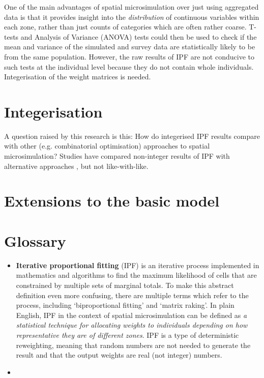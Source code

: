 \documentclass[a4paper, 11pt, twoside]{article}
\begin{document}
One of the main advantages %
of spatial microsimulation over just using aggregated data is that it provides
insight into the \emph{distribution} of continuous variables within each zone,
rather than just counts of categories which are often rather coarse. T-tests and
Analysis of Variance (ANOVA) tests could then be used to check if the
mean and variance of the simulated and survey data are statistically likely
to be from the same population. However, the raw results of IPF are not
conducive to such tests at the individual level because they do not contain
whole individuals. Integerisation of the weight matrices is needed.


\section{Integerisation} 
A question raised by this research is this: How do integerised IPF results
compare with other (e.g. combinatorial optimisation) approaches to spatial
microsimulation?
Studies have compared non-integer results of IPF with
alternative approaches \citep{harland2012}, but not like-with-like.

\section{Extensions to the basic model}
\label{discuss}

\section{Glossary}
\begin{itemize}
 \item \textbf{Iterative proportional fitting} (IPF) is an iterative process implemented in
mathematics and algorithms to find the maximum likelihood of cells that are constrained by
multiple sets of marginal totals. To make this abstract definition even more confusing, there are
multiple terms which refer to the process, including `biproportional fitting' and `matrix raking'.
In plain English, IPF in the context of spatial microsimulation
can be defined as \emph{a statistical technique for allocating weights to individuals depending
on how representative they are of different zones}. IPF is a type of deterministic reweighting,
meaning that random numbers are not needed to generate the result and that the output weights are real (not
integer) numbers.
\item \textbf{}
\end{itemize}
\end{document}
